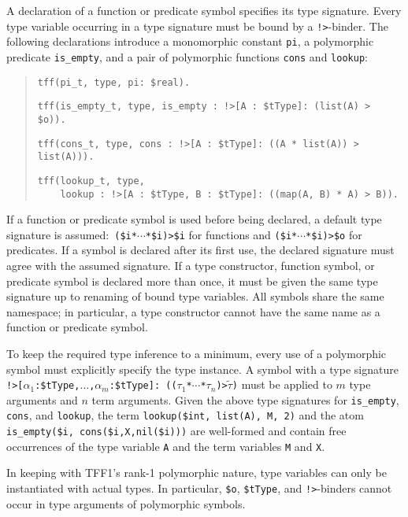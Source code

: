 A declaration of a function or predicate symbol specifies its type signature.
Every type variable occurring in a type signature must be bound by a
{\tt !>}-binder.
The following declarations introduce a monomorphic
constant {\tt pi}, a polymorphic predicate
{\tt is\_empty}, and a pair of polymorphic functions {\tt cons} and {\tt lookup}:
\begin{quote}
\verb+tff(pi_t, type, pi: $real).+
\par
\verb+tff(is_empty_t, type, is_empty : !>[A : $tType]: (list(A) > $o)).+\kern-10mm
\par
\pagebreak[2] %
\verb+tff(cons_t, type, cons : !>[A : $tType]: ((A * list(A)) > list(A))).+
\par
\pagebreak[2] %
\verb+tff(lookup_t, type,+\\
\verb+    lookup : !>[A : $tType, B : $tType]: ((map(A, B) * A) > B)).+\kern-10mm
\end{quote}
If a function or predicate symbol is used before being declared, a
default type signature is assumed:\ {\tt (\$i\;*\;${\cdots}$\;*\;\$i)\;>\;\$i}
for functions and {\tt (\$i\;*\;${\cdots}$\;*\;\$i)\;>\;\$o} for predicates.
If a symbol is declared after its first use, the declared signature
must agree with the assumed signature.
%
If a type constructor, function symbol, or predicate symbol is declared more
than once, it must be given the same type signature up to renaming of bound
type variables.
All symbols share the same namespace; in particular, a type constructor
cannot have the same name as a function or predicate symbol.

 To keep the required type
inference to a minimum, every use of a polymorphic symbol must explicitly
specify the type instance. A symbol with a type signature
{{\tt !>[$\alpha_1$\;:\;\$tType,\;${\dots}$,\;$\alpha_m$\;:\;\$tType]:\;%
(($\tau_1$\;*\;${\cdots}$\;*\;$\tau_n$)\;>\;$\tilde \tau$)}}
must be applied to $m$ type arguments and $n$ term arguments. Given the above
type signatures for {\tt is\_empty}, {\tt cons}, and {\tt lookup}, the term
\hbox{\tt lookup(\$int,\;\,list(A),\;\,M,\;\,2)}
and the atom
\hbox{\tt is\_empty(\$i,\;\,cons(\$i,\;X,\;nil(\$i)))}
are well-formed and contain free occurrences of the type variable {\tt A}
and the term variables {\tt M} and {\tt X}.

In keeping with TFF1's rank-1 polymorphic nature, type variables can only be
instantiated with actual types. In particular, \verb+$o+, \verb+$tType+,
and {\tt !>}-binders cannot occur in type arguments of polymorphic symbols.

